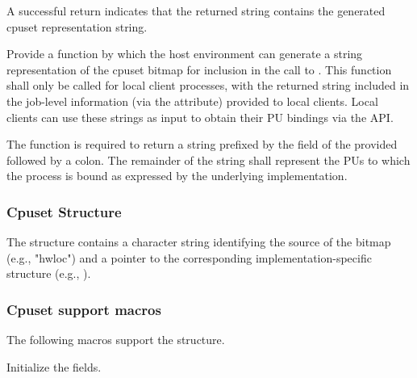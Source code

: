A successful return indicates that the returned string contains the generated cpuset representation string.

\returnsimple

\descr

Provide a function by which the host environment can generate a string representation of the cpuset bitmap for inclusion in the call to . This function shall only be called for local client processes, with the returned string included in the job-level information (via the  attribute) provided to local clients. Local clients can use these strings as input to obtain their \ac{PU} bindings via the  \ac{API}.

The function is required to return a string prefixed by the  field of the provided  followed by a colon. The remainder of the string shall represent the \acp{PU} to which the process is bound as expressed by the underlying implementation.

\subsubsection{Cpuset Structure}

The  structure contains a character string identifying the source of the bitmap (e.g., "hwloc") and a pointer to the corresponding implementation-specific structure (e.g., ).


\subsubsection{Cpuset support macros}
The following macros support the  structure.


Initialize the  fields.

